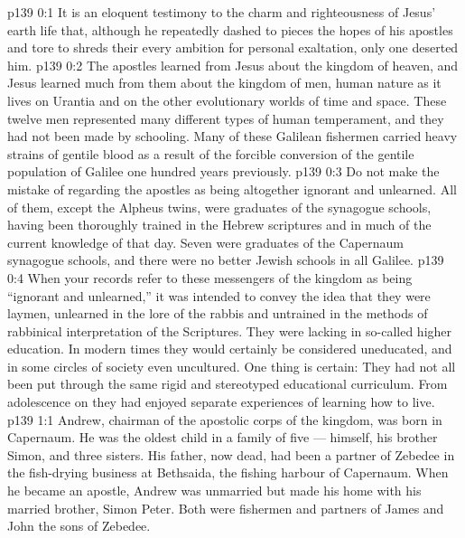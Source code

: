 \author{Midwayer Commission}
\vs p139 0:1 It is an eloquent testimony to the charm and righteousness of Jesus’ earth life that, although he repeatedly dashed to pieces the hopes of his apostles and tore to shreds their every ambition for personal exaltation, only one deserted him.
\vs p139 0:2 The apostles learned from Jesus about the kingdom of heaven, and Jesus learned much from them about the kingdom of men, human nature as it lives on Urantia and on the other evolutionary worlds of time and space. These twelve men represented many different types of human temperament, and they had not been made  by schooling. Many of these Galilean fishermen carried heavy strains of gentile blood as a result of the forcible conversion of the gentile population of Galilee one hundred years previously.
\vs p139 0:3 \pc Do not make the mistake of regarding the apostles as being altogether ignorant and unlearned. All of them, except the Alpheus twins, were graduates of the synagogue schools, having been thoroughly trained in the Hebrew scriptures and in much of the current knowledge of that day. Seven were graduates of the Capernaum synagogue schools, and there were no better Jewish schools in all Galilee.
\vs p139 0:4 When your records refer to these messengers of the kingdom as being “ignorant and unlearned,” it was intended to convey the idea that they were laymen, unlearned in the lore of the rabbis and untrained in the methods of rabbinical interpretation of the Scriptures. They were lacking in so\hyp{}called higher education. In modern times they would certainly be considered uneducated, and in some circles of society even uncultured. One thing is certain: They had not all been put through the same rigid and stereotyped educational curriculum. From adolescence on they had enjoyed separate experiences of learning how to live.
\vs p139 1:1 Andrew, chairman of the apostolic corps of the kingdom, was born in Capernaum. He was the oldest child in a family of five --- himself, his brother Simon, and three sisters. His father, now dead, had been a partner of Zebedee in the fish\hyp{}drying business at Bethsaida, the fishing harbour of Capernaum. When he became an apostle, Andrew was unmarried but made his home with his married brother, Simon Peter. Both were fishermen and partners of James and John the sons of Zebedee.
